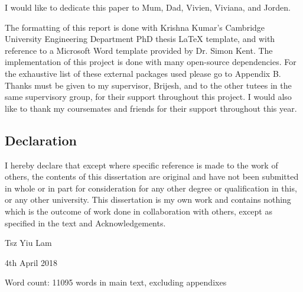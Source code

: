 
\begin{acknowledgements}      

\begin{center}
I would like to dedicate this paper to Mum, Dad, Vivien, Viviana, and Jorden.\\
\end{center}

The formatting of this report is done with Krishna Kumar's Cambridge University Engineering Department PhD thesis 
LaTeX template, and with reference to a Microsoft Word template provided by Dr. Simon Kent. 
The implementation of this project is done with many open-source dependencies.
For the exhaustive list of these external packages used please go to Appendix B.\\

Thanks must be given to my supervisor, Brijesh, and to the other tutees in the same supervisory group, 
for their support throughout this project. I would also like to thank my coursemates and friends for their 
support throughout this year.\\

\begin{center}
\section*{Declaration}
\end{center}
\vspace{1cm}
I hereby declare that except where specific reference is made to the work of 
others, the contents of this dissertation are original and have not been 
submitted in whole or in part for consideration for any other degree or 
qualification in this, or any other university. This dissertation is my own 
work and contains nothing which is the outcome of work done in collaboration 
with others, except as specified in the text and Acknowledgements.

\begin{flushright}
Tsz Yiu Lam

4th April 2018
\end{flushright}
\vspace{1cm}
\begin{center}
Word count: 11095 words in main text, excluding appendixes
\end{center}
\end{acknowledgements}
